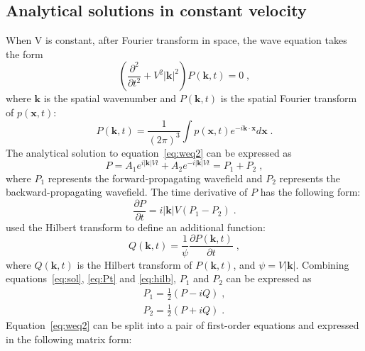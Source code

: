 \subsection{Analytical solutions in constant velocity}
When V is constant, after Fourier transform in space, the wave equation takes the form
\begin{equation}
  \label{eq:weq2}
\left( \frac{\partial^2}{\partial t^2} + V^2 |\mathbf{k}|^2 \right) P(\mathbf{k},t)=0\; ,
\end{equation}
where $\mathbf{k}$ is the spatial wavenumber and $P(\mathbf{k},t)$ is the spatial Fourier transform of $p(\mathbf{x},t)$:
\begin{equation}
  \label{eq:fft}
  P(\mathbf{k},t) = \frac{1}{(2\pi)^3}\int p(\mathbf{x},t) e^{-i\mathbf{k}\cdot\mathbf{x}}d\mathbf{x}\; .
\end{equation}
The analytical solution to equation~\ref{eq:weq2} can be expressed as
\begin{equation}
  \label{eq:sol}
P = A_1 e^{i|\mathbf{k}|Vt} + A_2 e^{-i|\mathbf{k}|Vt} = P_1 + P_2 \; ,
\end{equation}
where $P_1$ represents the forward-propagating wavefield and $P_2$ represents the backward-propagating wavefield. The time derivative of $P$ has the following form:
\begin{equation}
  \label{eq:Pt}
\frac{\partial P}{\partial t}=i|\mathbf{k}|V(P_1-P_2)\;.
\end{equation}
\cite{zhang09} used the Hilbert transform to define an additional function:
 \begin{equation}
  \label{eq:hilb}
Q(\mathbf{k},t)=\frac{1}{\psi}\frac{\partial P(\mathbf{k},t)}{\partial t}\;,
\end{equation}
where $Q(\mathbf{k},t)$ is the Hilbert transform of $P(\mathbf{k},t)$, and $\psi=V|\mathbf{k}|$.
Combining equations~\ref{eq:sol}, \ref{eq:Pt} and \ref{eq:hilb}, $P_1$ and $P_2$ can be expressed as
\begin{eqnarray}
  \label{eq:P12_1}
P_1=\frac{1}{2}\left(P - iQ \right) \; , \\
  \label{eq:P12_2}
P_2=\frac{1}{2}\left(P + iQ \right) \; .
\end{eqnarray}
Equation~\ref{eq:weq2} can be split into a pair of first-order equations and expressed in the following matrix form:
